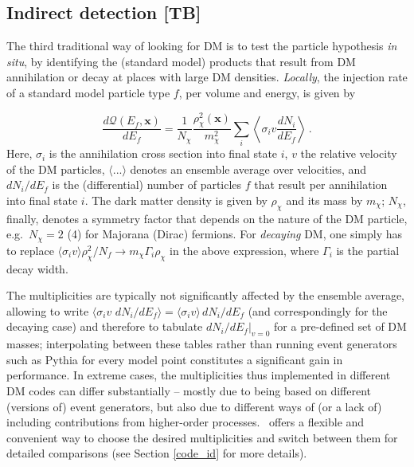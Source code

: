 \subsection{Indirect detection {\bf [TB]}}
\label{phys_id}

The third traditional way of looking for DM is to test the particle hypothesis {\it in situ}, by 
identifying the (standard model) products that result from DM annihilation or decay
at places with large DM densities. {\it Locally}, the injection rate of a standard model 
particle type $f$, per volume and energy, is given by

\begin{equation}
\frac{d\mathcal{Q}(E_f,\mathbf{x})}{dE_f}= \frac1{N_\chi} \frac{\rho_\chi^2(\mathbf{x})}{m_\chi^2} \sum_i \left\langle \sigma_i v \frac{dN_i}{dE_f}\right\rangle\,.
\end{equation}
Here, $\sigma_i$ is the annihilation cross section into final state $i$,  $v$ the relative 
velocity of the DM particles, $\langle...\rangle$ denotes an ensemble average over 
velocities, and $dN_i/dE_f$ is the (differential) number of particles $f$ that result per
annihilation into final state $i$. The dark matter density is given by $\rho_\chi$  and its 
mass by $m_\chi$; $N_\chi$, finally, denotes a symmetry factor that depends on the 
nature of the DM particle, e.g.~$N_\chi=2$ (4) for Majorana (Dirac) fermions.
For {\it decaying} DM, one simply has to replace 
$\langle \sigma_i v\rangle \rho_\chi^2/N_f\to m_\chi \Gamma_i \rho_\chi$ in the above 
expression, where $\Gamma_i$ is the partial decay width.

The multiplicities are typically not significantly affected by the ensemble average, allowing 
to write $\langle \sigma_i v$ $ {dN_i}/{dE_f}\rangle=\langle \sigma_i v \rangle \, {dN_i}/{dE_f}$ 
(and correspondingly for the decaying case)
and therefore to tabulate $\left.{dN_i}/{dE_f}\right|_{v=0}$ for a pre-defined set of DM 
masses; interpolating between these tables rather than running event generators such as 
{\sf Pythia} \cite{pythia} for every model point constitutes a significant gain in performance. 
In extreme cases, the multiplicities thus implemented in different DM codes can differ 
substantially -- mostly due to being based on different (versions of) event 
generators, but also due to different ways of (or a lack of) including contributions from 
higher-order  processes. \DB\ offers a flexible and convenient way to choose the desired 
multiplicities and switch between them for detailed comparisons (see Section \ref{code_id} 
for more details).

